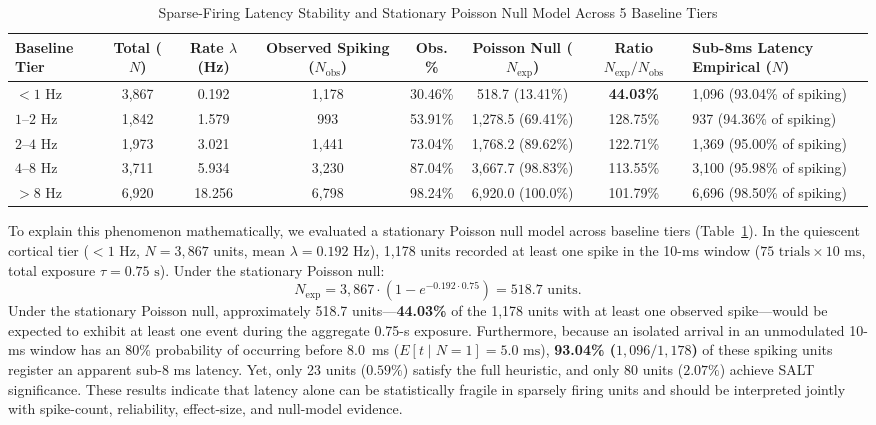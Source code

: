\documentclass[10pt,journal,compsoc]{IEEEtran}
\begin{document}
\begin{table}[t]
\caption{Sparse-Firing Latency Stability and Stationary Poisson Null Model Across 5 Baseline Tiers}
\label{tab:sparse_firing}
\centering
\begin{tabularx}{\textwidth}{lccccccX}
\toprule
\textbf{Baseline Tier} & \textbf{Total ($N$)} & \textbf{Rate $\lambda$ (Hz)} & \textbf{Observed Spiking ($N_{\text{obs}}$)} & \textbf{Obs. \%} & \textbf{Poisson Null ($N_{\text{exp}}$)} & \textbf{Ratio $N_{\text{exp}}/N_{\text{obs}}$} & \textbf{Sub-8ms Latency Empirical ($N$)} \\
\midrule
$< 1\text{ Hz}$  & 3,867 & 0.192 & 1,178 & 30.46\% & 518.7 (13.41\%) & \textbf{44.03\%} & 1,096 (93.04\% of spiking) \\
$1–2\text{ Hz}$  & 1,842 & 1.579 & 993   & 53.91\% & 1,278.5 (69.41\%)& 128.75\%        & 937 (94.36\% of spiking) \\
$2–4\text{ Hz}$  & 1,973 & 3.021 & 1,441 & 73.04\% & 1,768.2 (89.62\%)& 122.71\%        & 1,369 (95.00\% of spiking) \\
$4–8\text{ Hz}$  & 3,711 & 5.934 & 3,230 & 87.04\% & 3,667.7 (98.83\%)& 113.55\%        & 3,100 (95.98\% of spiking) \\
$> 8\text{ Hz}$  & 6,920 & 18.256& 6,798 & 98.24\% & 6,920.0 (100.0\%)& 101.79\%        & 6,696 (98.50\% of spiking) \\
\bottomrule
\end{tabularx}
\end{table}

To explain this phenomenon mathematically, we evaluated a stationary Poisson null model across baseline tiers (Table~\ref{tab:sparse_firing}). In the quiescent cortical tier ($<1\text{ Hz}$, $N=3,867$ units, mean $\lambda = 0.192\text{ Hz}$), 1,178 units recorded at least one spike in the 10-ms window ($75\text{ trials} \times 10\text{ ms}$, total exposure $\tau = 0.75\text{ s}$). Under the stationary Poisson null:
\begin{equation}
    N_{\text{exp}} = 3,867 \cdot (1 - e^{-0.192 \cdot 0.75}) = 518.7\text{ units}.
\end{equation}
Under the stationary Poisson null, approximately 518.7 units—\textbf{44.03\%} of the 1,178 units with at least one observed spike—would be expected to exhibit at least one event during the aggregate 0.75-s exposure. Furthermore, because an isolated arrival in an unmodulated 10-ms window has an 80\% probability of occurring before 8.0~ms ($E[t \mid N=1] = 5.0\text{ ms}$), \textbf{93.04\% ($1,096/1,178$)} of these spiking units register an apparent sub-8 ms latency. Yet, only 23 units ($0.59\%$) satisfy the full heuristic, and only 80 units ($2.07\%$) achieve SALT significance. These results indicate that latency alone can be statistically fragile in sparsely firing units and should be interpreted jointly with spike-count, reliability, effect-size, and null-model evidence.
\end{document}
